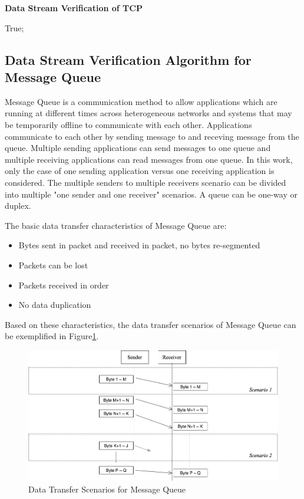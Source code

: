 \begin{algorithm}[H]
\DontPrintSemicolon
\caption{{\bf Data Stream Verification of TCP} \label{dataAlg2}}
\;
 \KwRet True;\;
\end{algorithm} 



\subsection{Data Stream Verification Algorithm for Message Queue}
Message Queue is a communication method to allow applications which are running at different times across heterogeneous networks and systems that may be temporarily offline to communicate with each other. Applications communicate to each other by sending message to and receving message from the queue. Multiple sending applications can send messages to one queue and multiple receiving applications can read messages from one queue.\cite{redkar2004pro} In this work, only the case of one sending application versus one receiving application is considered. The multiple senders to multiple receivers scenario can be divided into multiple "one sender and one receiver" scenarios. A queue can be one-way or duplex.

The basic data transfer characteristics of Message Queue are:
\begin{itemize}
  \item Bytes sent in packet and received in packet, no bytes re-segmented
  \item Packets can be lost
  \item Packets received in order
  \item No data duplication
\end{itemize}
Based on these characteristics, the data transfer scenarios of Message Queue can be exemplified in Figure\ref{msmq}.
\begin{figure}[H]
\centerline{\includegraphics[scale=0.4]{Figures/msmq}}
\caption{Data Transfer Scenarios for Message Queue}
\label{msmq}
\end{figure}

